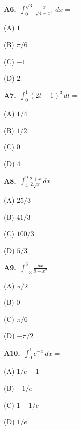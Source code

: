 \documentclass[11pt]{article}
\begin{document}
\bigskip\noindent\textbf{A6.}\ $\int_0^{\sqrt3}\frac{x}{\sqrt{4-x^2}}\,dx=$
\begin{list}{}{\setlength{\leftmargin}{3em}\setlength{\labelwidth}{2.5em}\setlength{\itemsep}{0pt}\setlength{\topsep}{2pt}}
\item[(A)] $1$
\item[(B)] $\pi/6$
\item[(C)] $-1$
\item[(D)] $2$
\end{list}

\bigskip\noindent\textbf{A7.}\ $\int_0^1(2t-1)^3\,dt=$
\begin{list}{}{\setlength{\leftmargin}{3em}\setlength{\labelwidth}{2.5em}\setlength{\itemsep}{0pt}\setlength{\topsep}{2pt}}
\item[(A)] $1/4$
\item[(B)] $1/2$
\item[(C)] $0$
\item[(D)] $4$
\end{list}

\bigskip\noindent\textbf{A8.}\ $\int_4^9\frac{2+x}{2\sqrt{x}}\,dx=$
\begin{list}{}{\setlength{\leftmargin}{3em}\setlength{\labelwidth}{2.5em}\setlength{\itemsep}{0pt}\setlength{\topsep}{2pt}}
\item[(A)] $25/3$
\item[(B)] $41/3$
\item[(C)] $100/3$
\item[(D)] $5/3$
\end{list}

\bigskip\noindent\textbf{A9.}\ $\int_{-3}^3\frac{dx}{9+x^2}=$
\begin{list}{}{\setlength{\leftmargin}{3em}\setlength{\labelwidth}{2.5em}\setlength{\itemsep}{0pt}\setlength{\topsep}{2pt}}
\item[(A)] $\pi/2$
\item[(B)] $0$
\item[(C)] $\pi/6$
\item[(D)] $-\pi/2$
\end{list}

\bigskip\noindent\textbf{A10.}\ $\int_0^1e^{-x}\,dx=$
\begin{list}{}{\setlength{\leftmargin}{3em}\setlength{\labelwidth}{2.5em}\setlength{\itemsep}{0pt}\setlength{\topsep}{2pt}}
\item[(A)] $1/e-1$
\item[(B)] $-1/e$
\item[(C)] $1-1/e$
\item[(D)] $1/e$
\end{list}
\end{document}
